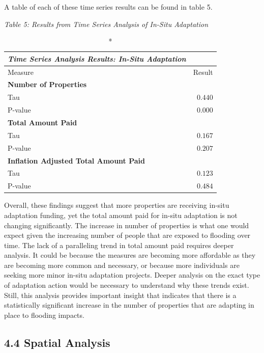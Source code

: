 \documentclass[
  12pt,
]{article}
\begin{document}
A table of each of these time series results can be found in table 5.

\emph{Table 5: Results from Time Series Analysis of In-Situ
Adaptation}\\
\captionsetup[table]{labelformat=empty,skip=1pt}

\begin{longtable}{lr}
\caption*{
{\large \emph{\textbf{Time Series Analysis Results: In-Situ Adaptation}}}
} \\ 
\toprule
Measure & Result \\ 
\midrule
\multicolumn{1}{l}{\textbf{Number of Properties}} \\ 
\midrule
Tau & $0.440$ \\ 
P-value & $0.000$ \\ 
\midrule
\multicolumn{1}{l}{\textbf{Total Amount Paid}} \\ 
\midrule
Tau & $0.167$ \\ 
P-value & $0.207$ \\ 
\midrule
\multicolumn{1}{l}{\textbf{Inflation Adjusted Total Amount Paid}} \\ 
\midrule
Tau & $0.123$ \\ 
P-value & $0.484$ \\ 
\bottomrule
\end{longtable}

Overall, these findings suggest that more properties are receiving
in-situ adaptation funding, yet the total amount paid for in-situ
adaptation is not changing significantly. The increase in number of
properties is what one would expect given the increasing number of
people that are exposed to flooding over time. The lack of a paralleling
trend in total amount paid requires deeper analysis. It could be because
the measures are becoming more affordable as they are becoming more
common and necessary, or because more individuals are seeking more minor
in-situ adaptation projects. Deeper analysis on the exact type of
adaptation action would be necessary to understand why these trends
exist. Still, this analysis provides important insight that indicates
that there is a statistically significant increase in the number of
properties that are adapting in place to flooding impacts.

\hypertarget{spatial-analysis}{%
\subsection{4.4 Spatial Analysis}\label{spatial-analysis}}
\end{document}

